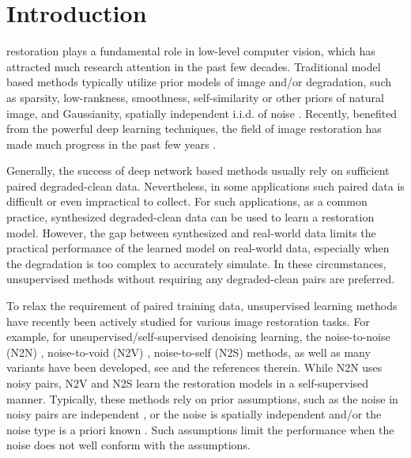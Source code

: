 \documentclass[10pt,journal,compsoc]{IEEEtran}
\begin{document}
\maketitle


\IEEEdisplaynontitleabstractindextext



\section{Introduction}
\label{sec:introduction}

 restoration plays a fundamental 
role in low-level computer vision, which has attracted 
much research attention in the past few decades.
Traditional model based methods typically utilize 
prior models of image and/or degradation, such as
sparsity, low-rankness, smoothness, self-similarity 
or other priors of natural image, and Gaussianity, spatially 
independent i.i.d. of noise \cite{nlm,bm3d,elad1997restoration,dsc,he2010single}.
Recently, benefited from the powerful
deep learning techniques, the field of image restoration has made
much progress in the past few years \cite{mao2016image,zhang2020residual}.

Generally, the success of deep network based methods usually rely on sufficient
paired degraded-clean data. Nevertheless, in some applications
such paired data is difficult or even impractical
to collect. For such applications, as a common practice, 
synthesized degraded-clean data can be used to learn a restoration model.
However, the gap between synthesized and real-world data
limits the practical performance of the learned model on real-world data,
especially when the degradation is too complex to accurately simulate.
In these circumstances, unsupervised methods without 
requiring any degraded-clean pairs are preferred.

To relax the requirement of paired training data,
unsupervised learning methods have recently been
actively studied for various image restoration tasks.
For example, for unsupervised/self-supervised denoising
learning, the noise-to-noise (N2N) \cite{n2n}, 
noise-to-void (N2V) \cite{n2v}, noise-to-self (N2S) \cite{n2s} methods,
as well as many variants have been developed, see 
\cite{mbvd,s2s,esur,laine2019high,wu2020unpaired} and the references therein.
While N2N uses noisy pairs, N2V and N2S learn the restoration 
models in a self-supervised manner. Typically, these 
methods rely on prior assumptions, such as the noise in noisy pairs 
are independent \cite{n2n,mbvd,esur}, or the noise is spatially independent 
and/or the noise type is a priori known \cite{n2v,n2s,laine2019high,wu2020unpaired}.
Such assumptions limit the performance when the noise
does not well conform with the assumptions.
\end{document}
